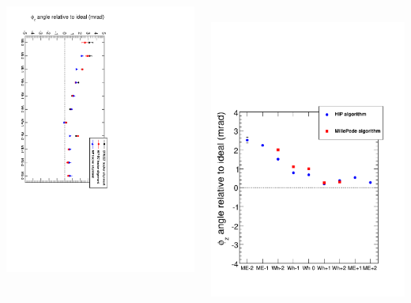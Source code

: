 \documentclass[compress]{beamer}
\begin{document}
\begin{frame}
\begin{columns}
\includegraphics[height=1.25\linewidth, angle=90]{compare_tracker_alignment_phiz.pdf}

\mbox{ } \hfill \includegraphics[width=0.625\linewidth]{hip_millepede_overlay_phiz.pdf} \hfill \mbox{ }


\end{columns}
\end{frame}
\end{document}
